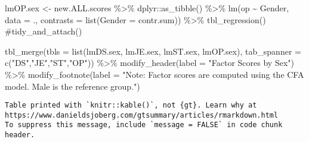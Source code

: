 \documentclass[
  letterpaper,
  DIV=11,
  numbers=noendperiod]{scrartcl}
\newenvironment{Shaded}{\begin{snugshade}}{\end{snugshade}}
\newcommand{\AttributeTok}[1]{\textcolor[rgb]{0.40,0.45,0.13}{#1}}
\newcommand{\CommentTok}[1]{\textcolor[rgb]{0.37,0.37,0.37}{#1}}
\newcommand{\FunctionTok}[1]{\textcolor[rgb]{0.28,0.35,0.67}{#1}}
\newcommand{\NormalTok}[1]{\textcolor[rgb]{0.00,0.23,0.31}{#1}}
\newcommand{\OtherTok}[1]{\textcolor[rgb]{0.00,0.23,0.31}{#1}}
\newcommand{\SpecialCharTok}[1]{\textcolor[rgb]{0.37,0.37,0.37}{#1}}
\newcommand{\StringTok}[1]{\textcolor[rgb]{0.13,0.47,0.30}{#1}}
\begin{document}
\begin{Shaded}
\begin{Highlighting}[]
\NormalTok{lmOP.sex }\OtherTok{\textless{}{-}}\NormalTok{ new.ALL.scores }\SpecialCharTok{\%\textgreater{}\%}
\NormalTok{  dplyr}\SpecialCharTok{::}\FunctionTok{as\_tibble}\NormalTok{() }\SpecialCharTok{\%\textgreater{}\%}
  \FunctionTok{lm}\NormalTok{(op }\SpecialCharTok{\textasciitilde{}}\NormalTok{ Gender, }
     \AttributeTok{data =}\NormalTok{ .,}
     \AttributeTok{contrasts =} \FunctionTok{list}\NormalTok{(}\AttributeTok{Gender =}\NormalTok{ contr.sum)) }\SpecialCharTok{\%\textgreater{}\%}
  \FunctionTok{tbl\_regression}\NormalTok{()}
  \CommentTok{\#tidy\_and\_attach()}

\FunctionTok{tbl\_merge}\NormalTok{(}\AttributeTok{tbls =} \FunctionTok{list}\NormalTok{(lmDS.sex, lmJE.sex, lmST.sex, lmOP.sex),}
          \AttributeTok{tab\_spanner =} \FunctionTok{c}\NormalTok{(}\StringTok{"DS"}\NormalTok{,}\StringTok{"JE"}\NormalTok{,}\StringTok{"ST"}\NormalTok{,}\StringTok{"OP"}\NormalTok{)) }\SpecialCharTok{\%\textgreater{}\%}
  \FunctionTok{modify\_header}\NormalTok{(}\AttributeTok{label =} \StringTok{"Factor Scores by Sex"}\NormalTok{) }\SpecialCharTok{\%\textgreater{}\%}
  \FunctionTok{modify\_footnote}\NormalTok{(}\AttributeTok{label =} \StringTok{"Note: Factor scores are computed using the CFA model.  Male is the reference group."}\NormalTok{)}
\end{Highlighting}
\end{Shaded}

\begin{verbatim}
Table printed with `knitr::kable()`, not {gt}. Learn why at
https://www.danieldsjoberg.com/gtsummary/articles/rmarkdown.html
To suppress this message, include `message = FALSE` in code chunk header.
\end{verbatim}
\end{document}

